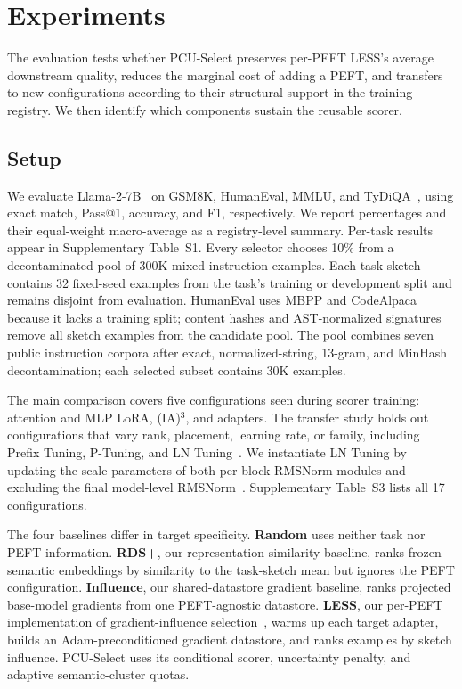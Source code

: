 \section{Experiments}
\label{sec:experiments}

The evaluation tests whether PCU-Select preserves per-PEFT LESS's average downstream quality, reduces the marginal cost of adding a PEFT, and transfers to new configurations according to their structural support in the training registry. We then identify which components sustain the reusable scorer.

\subsection{Setup}

We evaluate Llama-2-7B~\cite{touvron2023llama2} on GSM8K, HumanEval, MMLU, and TyDiQA~\cite{cobbe2021gsm8k,chen2021humaneval,hendrycks2021mmlu,clark2020tydiqa}, using exact match, Pass@1, accuracy, and F1, respectively. We report percentages and their equal-weight macro-average as a registry-level summary. Per-task results appear in Supplementary Table~S1. Every selector chooses 10\% from a decontaminated pool of 300K mixed instruction examples. Each task sketch contains 32 fixed-seed examples from the task's training or development split and remains disjoint from evaluation. HumanEval uses MBPP and CodeAlpaca because it lacks a training split; content hashes and AST-normalized signatures remove all sketch examples from the candidate pool. The pool combines seven public instruction corpora after exact, normalized-string, 13-gram, and MinHash decontamination; each selected subset contains 30K examples.

The main comparison covers five configurations seen during scorer training: attention and MLP LoRA, (IA)$^3$, and adapters. The transfer study holds out configurations that vary rank, placement, learning rate, or family, including Prefix Tuning, P-Tuning, and LN Tuning~\cite{wang2022lntuning}. We instantiate LN Tuning by updating the scale parameters of both per-block RMSNorm modules and excluding the final model-level RMSNorm~\cite{touvron2023llama2}. Supplementary Table~S3 lists all 17 configurations.

The four baselines differ in target specificity. \textbf{Random} uses neither task nor PEFT information. \textbf{RDS+}, our representation-similarity baseline, ranks frozen semantic embeddings by similarity to the task-sketch mean but ignores the PEFT configuration. \textbf{Influence}, our shared-datastore gradient baseline, ranks projected base-model gradients from one PEFT-agnostic datastore. \textbf{LESS}, our per-PEFT implementation of gradient-influence selection~\cite{xia2024less}, warms up each target adapter, builds an Adam-preconditioned gradient datastore, and ranks examples by sketch influence. PCU-Select uses its conditional scorer, uncertainty penalty, and adaptive semantic-cluster quotas.

